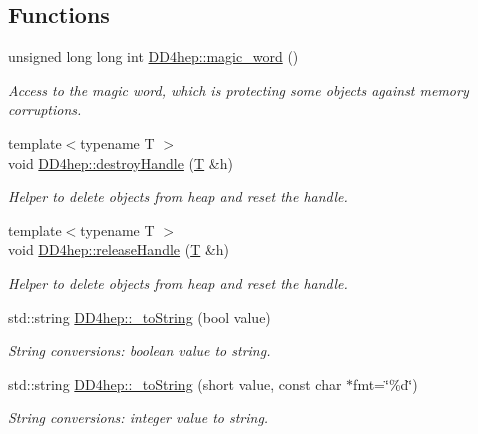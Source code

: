 \subsection*{Functions}
\begin{DoxyCompactItemize}
\item 
unsigned long long int \hyperlink{group___d_d4_h_e_p___g_e_o_m_e_t_r_y_ga2410a636084da38b545f3774a04705be}{DD4hep::magic\_\-word} ()
\begin{DoxyCompactList}\small\item\em Access to the magic word, which is protecting some objects against memory corruptions. \item\end{DoxyCompactList}\item 
{\footnotesize template$<$typename T $>$ }\\void \hyperlink{group___d_d4_h_e_p___g_e_o_m_e_t_r_y_ga613cd8eaf766f07c2abb80e73e618397}{DD4hep::destroyHandle} (\hyperlink{class_t}{T} \&h)
\begin{DoxyCompactList}\small\item\em Helper to delete objects from heap and reset the handle. \item\end{DoxyCompactList}\item 
{\footnotesize template$<$typename T $>$ }\\void \hyperlink{group___d_d4_h_e_p___g_e_o_m_e_t_r_y_gab94bee1dd649ac3d00893e4129f2f22a}{DD4hep::releaseHandle} (\hyperlink{class_t}{T} \&h)
\begin{DoxyCompactList}\small\item\em Helper to delete objects from heap and reset the handle. \item\end{DoxyCompactList}\item 
std::string \hyperlink{group___d_d4_h_e_p___g_e_o_m_e_t_r_y_gaf0b4c8d8a6efc966a3609c4594448050}{DD4hep::\_\-toString} (bool value)
\begin{DoxyCompactList}\small\item\em String conversions: boolean value to string. \item\end{DoxyCompactList}\item 
std::string \hyperlink{group___d_d4_h_e_p___g_e_o_m_e_t_r_y_ga33b8273e6b24bc97470fb7681a071e5f}{DD4hep::\_\-toString} (short value, const char $\ast$fmt=\char`\"{}\%d\char`\"{})
\begin{DoxyCompactList}\small\item\em String conversions: integer value to string. \item\end{DoxyCompactList}\item 

\end{DoxyCompactItemize}
